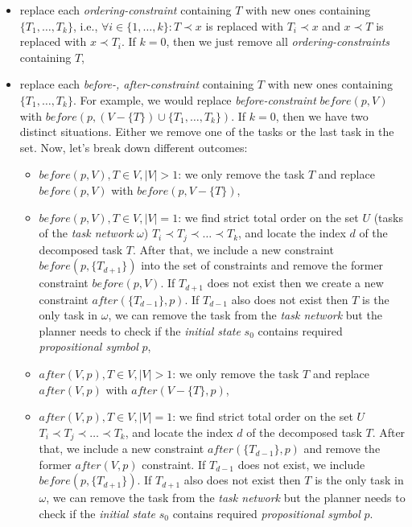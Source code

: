 \begin{itemize}
    \item replace each \emph{ordering-constraint} containing $T$ with new ones containing $\{ T_1, \dots, T_k \}$, i.e., $\forall i \in \{ 1, \dots, k \}: T \prec x$ is replaced with $T_i \prec x$ and $x \prec T$ is replaced with $x \prec T_i$. If $k = 0$, then we just remove all \emph{ordering-constraints} containing $T$,
        
    \item replace each \emph{before-, after-constraint} containing $T$ with new ones containing $\{ T_1, \dots, T_k \}$. For example, we would replace \emph{before-constraint} $before(p,V)$ with $before(p, (V - \{T\}) \cup \{ T_1, \dots, T_k \})$. If $k = 0$, then we have two distinct situations. Either we remove one of the tasks or the last task in the set. Now, let's break down different outcomes:

        \begin{itemize}
            \item $before(p, V), T \in V, |V| > 1$: we only remove the task $T$ and replace $before(p, V)$ with $before(p, V - \{ T \})$,

            \item $before(p, V), T \in V, |V| = 1$: we find strict total order on the set $U$ (tasks of the \emph{task network} $\omega$) $T_i \prec T_j \prec \dots \prec T_k$, and locate the index $d$ of the decomposed task $T$. After that, we include a new constraint $before(p, \{ T_{d+1} \})$ into the set of constraints and remove the former constraint $before(p, V)$. If $T_{d+1}$ does not exist then we create a new constraint $after(\{ T_{d-1} \}, p)$. If $T_{d-1}$ also does not exist then $T$ is the only task in $\omega$, we can remove the task from the \emph{task network} but the planner needs to check if the \emph{initial state} $s_0$ contains required \emph{propositional symbol} $p$,

            \item $after(V, p), T \in V, |V| > 1$: we only remove the task $T$ and replace $after(V, p)$ with $after(V - \{ T \}, p)$,

            \item $after(V, p), T \in V, |V| = 1$: we find strict total order on the set $U$ $T_i \prec T_j \prec \dots \prec T_k$, and locate the index $d$ of the decomposed task $T$. After that, we include a new constraint $after(\{ T_{d-1} \}, p)$ and remove the former $after(V, p)$ constraint. If $T_{d-1}$ does not exist, we include $before(p, \{ T_{d+1} \})$. If $T_{d+1}$ also does not exist then $T$ is the only task in $\omega$, we can remove the task from the \emph{task network} but the planner needs to check if the \emph{initial state} $s_0$ contains required \emph{propositional symbol} $p$.
        \end{itemize}
\end{itemize}

